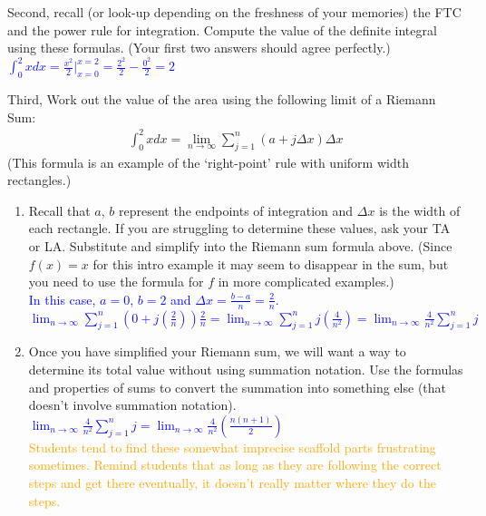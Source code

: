 \documentclass{ximera}
\begin{document}
\begin{exercise}
    Second, recall (or look-up depending on the freshness of your memories) the FTC and the power rule for integration. Compute the value of the definite integral using these formulas. (Your first two answers should agree perfectly.)\\
    \textcolor{blue}{$\displaystyle\int_0^2 xdx=\frac{x^2}{2}\bigg|_{x=0}^{x=2}=\frac{2^2}{2}-\frac{0^2}{2}=2$}
\end{exercise}

\begin{exercise}
    Third, Work out the value of the area using the following limit of a Riemann Sum:
\begin{align}
	\int_{0}^2 x dx = \lim_{n\rightarrow \infty} \sum_{j=1}^n (a + j\Delta x)\Delta x \nonumber
\end{align}
    (This formula is an example of the `right-point' rule with uniform width rectangles.)\\
    \begin{enumerate}
        \item Recall that $a$, $b$ represent the endpoints of integration and $\Delta x$ is the width of each rectangle.  If you are struggling to determine these values, ask your TA or LA. Substitute and simplify into the Riemann sum formula above. (Since $f(x)=x$ for this intro example it may seem to disappear in the sum, but you need to use the formula for $f$ in more complicated examples.)\\
        \textcolor{blue}{In this case, $a=0$, $b=2$ and $\Delta x=\frac{b-a}{n}=\frac{2}{n}$.\\
$\displaystyle\lim_{n\rightarrow \infty}\sum_{j=1}^{n}(0+j(\frac2n))\frac{2}{n}=\lim_{n\rightarrow \infty}\sum_{j=1}^n j(\frac{4}{n^2})=\lim_{n\rightarrow \infty}\frac{4}{n^2}\sum_{j=1}^n j$}
        
        \item Once you have simplified your Riemann sum, we will want a way to determine its total value without using summation notation. Use the formulas and properties of sums to convert the summation into something else (that doesn't involve summation notation).\\
        \textcolor{blue}{$\displaystyle \lim_{n\rightarrow \infty}\frac{4}{n^2}\sum_{j=1}^n j=\lim_{n\rightarrow \infty} \frac{4}{n^2}(\frac{n(n+1)}{2})$}\\
        \textcolor{orange}{Students tend to find these somewhat imprecise scaffold parts frustrating sometimes.  Remind students that as long as they are following the correct steps and get there eventually, it doesn't really matter where they do the steps.}
        

\end{enumerate}
\end{exercise}
\end{document}
